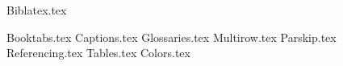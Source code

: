 {Biblatex.tex}
\usepackage[letterpaper, margin=2cm,includefoot,footskip=30pt]{geometry}
\usepackage[spanish, english]{babel}
\usepackage{amsmath}
\usepackage{amsthm}
\usepackage{amssymb}
\usepackage{csquotes}
\usepackage{expl3}
\usepackage{fontspec}
\usepackage{graphicx}
\usepackage{keyval}
\usepackage{url}
\usepackage{xparse}
\usepackage{blindtext}
\usepackage{datetime2}
\usepackage{float}
\usepackage{algorithm}
\usepackage{algpseudocode}
\usepackage{kbordermatrix}
{Booktabs.tex}
{Captions.tex}
{Glossaries.tex}
{Multirow.tex}
{Parskip.tex}
{Referencing.tex}
{Tables.tex}
{Colors.tex}